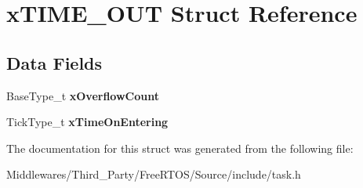\hypertarget{structx_t_i_m_e___o_u_t}{}\section{x\+T\+I\+M\+E\+\_\+\+O\+UT Struct Reference}
\label{structx_t_i_m_e___o_u_t}
\subsection*{Data Fields}
\begin{DoxyCompactItemize}
\item 
\mbox{\label{structx_t_i_m_e___o_u_t_a5d03952a36301f2056265f3fff437b55}} 
Base\+Type\+\_\+t {\bfseries x\+Overflow\+Count}
\item 
\mbox{\label{structx_t_i_m_e___o_u_t_adebf6236514a7e0fa24464dcf4100f14}} 
Tick\+Type\+\_\+t {\bfseries x\+Time\+On\+Entering}
\end{DoxyCompactItemize}


The documentation for this struct was generated from the following file\+:\begin{DoxyCompactItemize}
\item 
Middlewares/\+Third\+\_\+\+Party/\+Free\+R\+T\+O\+S/\+Source/include/task.\+h\end{DoxyCompactItemize}
